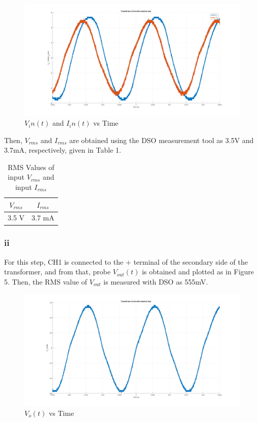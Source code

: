 \documentclass[letterpaper,12pt]{article}
\begin{document}
\begin{figure}[H]
    \centering
    \includegraphics[width = 1\textwidth]{2_1.png}
    \caption{\(V_in(t) \) and \(I_in(t)\) vs Time}
\end{figure} 
Then, \(V_{rms}\) and \(I_{rms}\) are obtained using the DSO measurement tool as 3.5V and 3.7mA, respectively, given in Table 1.
\begin{table}[H]
    \begin{center}
        \caption{RMS Values of input \(V_{rms}\) and input \(I_{rms}\)}
        \vspace{2mm}
        \begin{tabular}{||c | c ||} 
            \hline
            \(V_{rms}\) & \(I_{rms}\) \\ [0.5ex] 
            \hline\hline
            3.5 V & 3.7 mA    \\
            \hline
        \end{tabular}
    \end{center}
\end{table}

\subsubsection{ii}
For this step, CH1 is connected to the + terminal of the secondary side of the transformer, and from that, probe \(V_{out}(t)\) is obtained and plotted as in Figure 5. Then, the RMS value of \(V_{out}\) is measured with DSO as 555mV.
\begin{figure}[H]
    \centering
    \includegraphics[width = 1\textwidth]{2_2.png}
    \caption{\(V_o(t) \) vs Time}
\end{figure} 
\end{document}
